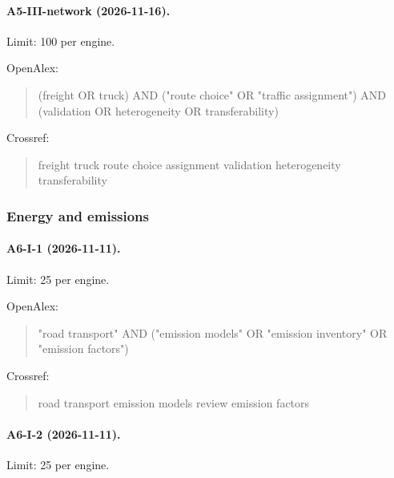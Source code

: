 \paragraph{A5-III-network (2026-11-16).} Limit: 100 per engine.

\noindent OpenAlex:

\begin{quote}\footnotesize\ttfamily\raggedright

(freight OR truck) AND ("route choice" OR "traffic assignment") AND (validation OR heterogeneity OR transferability)

\end{quote}

\noindent Crossref:

\begin{quote}\footnotesize\ttfamily\raggedright

freight truck route choice assignment validation heterogeneity transferability

\end{quote}

\subsubsection{Energy and emissions}

\paragraph{A6-I-1 (2026-11-11).} Limit: 25 per engine.

\noindent OpenAlex:

\begin{quote}\footnotesize\ttfamily\raggedright

"road transport" AND ("emission models" OR "emission inventory" OR "emission factors")

\end{quote}

\noindent Crossref:

\begin{quote}\footnotesize\ttfamily\raggedright

road transport emission models review emission factors

\end{quote}

\paragraph{A6-I-2 (2026-11-11).} Limit: 25 per engine.

